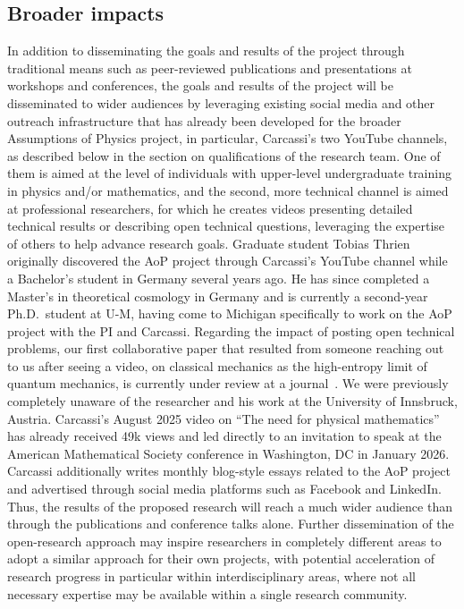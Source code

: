 


\subsection{Broader impacts}
In addition to disseminating the goals and results of the project through traditional means such as peer-reviewed publications and presentations at workshops and conferences, the goals and results of the project will be disseminated to wider audiences by leveraging existing social media and other outreach infrastructure that has already been developed for the broader Assumptions of Physics project, in particular, Carcassi's two YouTube channels, as described below in the section on qualifications of the research team.  One of them is aimed at the level of individuals with upper-level undergraduate training in physics and/or mathematics, and the second, more technical channel is aimed at professional researchers, for which he creates videos presenting detailed technical results or describing open technical questions, leveraging the expertise of others to help advance research goals.  Graduate student Tobias Thrien originally discovered the AoP project through Carcassi's YouTube channel while a Bachelor's student in Germany several years ago.  He has since completed a Master's in theoretical cosmology in Germany and is currently a second-year Ph.D.~student at U-M, having come to Michigan specifically to work on the AoP project with the PI and Carcassi.  Regarding the impact of posting open technical problems, our first collaborative paper that resulted from someone reaching out to us after seeing a video, on classical mechanics as the high-entropy limit of quantum mechanics, is currently under review at a journal~\cite{aop-classicallimit}.  We were previously completely unaware of the researcher and his work at the University of Innsbruck, Austria. Carcassi's August 2025 video on ``The need for physical mathematics'' has already received 49k views and led directly to an invitation to speak at the American Mathematical Society conference in Washington, DC in January 2026. Carcassi additionally writes monthly blog-style essays related to the AoP project and advertised through social media platforms such as Facebook and LinkedIn.  Thus, the results of the proposed research will reach a much wider audience than through the publications and conference talks alone.  Further dissemination of the open-research approach may inspire researchers in completely different areas to adopt a similar approach for their own projects, with potential acceleration of research progress in particular within interdisciplinary areas, where not all necessary expertise may be available within a single research community.  

